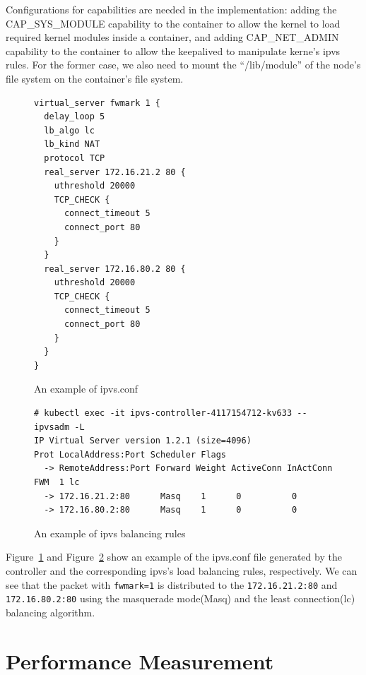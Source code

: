 Configurations for capabilities are needed in the implementation: adding the CAP\_SYS\_MODULE capability 
to the container to allow the kernel to load required kernel modules inside a container, 
and adding CAP\_NET\_ADMIN capability to the container to allow the keepalived to manipulate kerne's ipvs rules. 
For the former case, we also need to mount the \enquote{/lib/module} of the node's file system on the container's file system.

\begin{figure}
\begin{minipage}{0.7\columnwidth}
\begin{verbatim}
virtual_server fwmark 1 {
  delay_loop 5
  lb_algo lc
  lb_kind NAT
  protocol TCP
  real_server 172.16.21.2 80 {
    uthreshold 20000
    TCP_CHECK {
      connect_timeout 5
      connect_port 80
    }
  }
  real_server 172.16.80.2 80 {
    uthreshold 20000
    TCP_CHECK {
      connect_timeout 5
      connect_port 80
    }
  }
}
\end{verbatim}
\end{minipage}
\caption{An example of ipvs.conf}
\label{fig:ipvs.conf}
\end{figure}

\begin{figure}
\begin{minipage}{\columnwidth}
\small
\begin{verbatim}
# kubectl exec -it ipvs-controller-4117154712-kv633 -- ipvsadm -L
IP Virtual Server version 1.2.1 (size=4096)
Prot LocalAddress:Port Scheduler Flags
  -> RemoteAddress:Port Forward Weight ActiveConn InActConn
FWM  1 lc
  -> 172.16.21.2:80      Masq    1      0          0         
  -> 172.16.80.2:80      Masq    1      0          0
\end{verbatim}
\end{minipage}
\caption{An example of ipvs balancing rules}
\label{fig:ipvs rule}
\end{figure}


Figure~\ref{fig:ipvs.conf} and Figure~\ref{fig:ipvs rule} show an example of the ipvs.conf file 
generated by the controller and the corresponding ipvs's load balancing rules, respectively.
We can see that the packet with {\tt fwmark=1}\cite{BertHubert2002} is distributed 
to the {\tt 172.16.21.2:80} and {\tt 172.16.80.2:80} 
using the masquerade mode(Masq) and 
the least connection(lc)\cite{Zhang2000} balancing algorithm. 

\section{Performance Measurement}\label{Performance Measurement}


